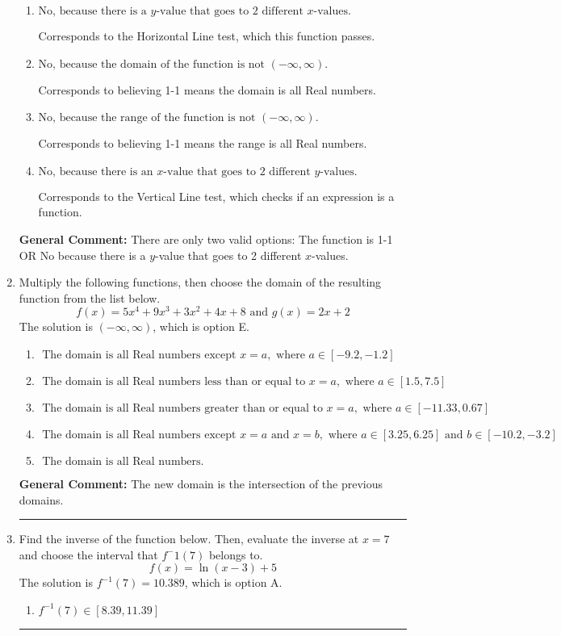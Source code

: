 \documentclass{extbook}[14pt]
\newcommand{\litem}[1]{\item #1

\rule{\textwidth}{0.4pt}}
\begin{document}
\begin{enumerate}
{\begin{enumerate}[label=\Alph*.]
* This is the solution.
\item \( \text{No, because there is a $y$-value that goes to 2 different $x$-values.} \)

Corresponds to the Horizontal Line test, which this function passes.
\item \( \text{No, because the domain of the function is not $(-\infty, \infty)$.} \)

Corresponds to believing 1-1 means the domain is all Real numbers.
\item \( \text{No, because the range of the function is not $(-\infty, \infty)$.} \)

Corresponds to believing 1-1 means the range is all Real numbers.
\item \( \text{No, because there is an $x$-value that goes to 2 different $y$-values.} \)

Corresponds to the Vertical Line test, which checks if an expression is a function.
\end{enumerate}

\textbf{General Comment:} There are only two valid options: The function is 1-1 OR No because there is a $y$-value that goes to 2 different $x$-values.
}
\litem{
Multiply the following functions, then choose the domain of the resulting function from the list below.
\[ f(x) = 5x^{4} +9 x^{3} +3 x^{2} +4 x + 8 \text{ and } g(x) = 2x + 2 \]The solution is \( (-\infty, \infty) \), which is option E.\begin{enumerate}[label=\Alph*.]
\item \( \text{ The domain is all Real numbers except } x = a, \text{ where } a \in [-9.2, -1.2] \)


\item \( \text{ The domain is all Real numbers less than or equal to } x = a, \text{ where } a \in [1.5, 7.5] \)


\item \( \text{ The domain is all Real numbers greater than or equal to } x = a, \text{ where } a \in [-11.33, 0.67] \)


\item \( \text{ The domain is all Real numbers except } x = a \text{ and } x = b, \text{ where } a \in [3.25, 6.25] \text{ and } b \in [-10.2, -3.2] \)


\item \( \text{ The domain is all Real numbers. } \)


\end{enumerate}

\textbf{General Comment:} The new domain is the intersection of the previous domains.
}
\litem{
Find the inverse of the function below. Then, evaluate the inverse at $x = 7$ and choose the interval that $f^-1(7)$ belongs to.
\[ f(x) = \ln{(x-3)}+5 \]The solution is \( f^{-1}(7) = 10.389 \), which is option A.\begin{enumerate}[label=\Alph*.]
\item \( f^{-1}(7) \in [8.39, 11.39] \)


\end{enumerate}}
\end{enumerate}
\end{document}
